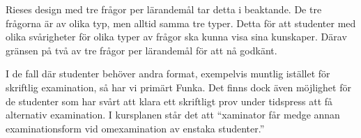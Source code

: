 Rieses design med tre frågor per lärandemål tar detta i beaktande.
De tre frågorna är av olika typ, men alltid samma tre typer.
Detta för att studenter med olika svårigheter för olika typer av frågor ska 
kunna visa sina kunskaper.
Därav gränsen på två av tre frågor per lärandemål för att nå godkänt.

I de fall där studenter behöver andra format, exempelvis muntlig istället för 
skriftlig examination, så har vi primärt Funka.
Det finns dock även möjlighet för de studenter som har svårt att klara ett 
skriftligt prov under tidspress att få alternativ examination.
I kursplanen står det att \enquote{xaminator får medge annan 
examinationsform vid omexamination av enstaka studenter.}

\begin{frame}[allowframebreaks]
  \printbibliography[heading=bibintoc]
\end{frame}

\appendix



